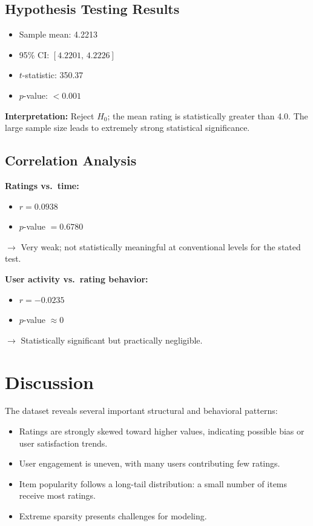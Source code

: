 \documentclass[conference]{IEEEtran}
\begin{document}
\subsection{Hypothesis Testing Results}

\begin{itemize}
    \item Sample mean: 4.2213
    \item 95\% CI: $[4.2201,\, 4.2226]$
    \item $t$-statistic: 350.37
    \item $p$-value: $< 0.001$
\end{itemize}

\textbf{Interpretation:} Reject $H_0$; the mean rating is statistically greater than 4.0. The large sample size leads to extremely strong statistical significance.

\subsection{Correlation Analysis}

\textbf{Ratings vs.\ time:}
\begin{itemize}
    \item $r = 0.0938$
    \item $p$-value $= 0.6780$
\end{itemize}
$\rightarrow$ Very weak; not statistically meaningful at conventional levels for the stated test.

\textbf{User activity vs.\ rating behavior:}
\begin{itemize}
    \item $r = -0.0235$
    \item $p$-value $\approx 0$
\end{itemize}
$\rightarrow$ Statistically significant but practically negligible.

\section{Discussion}

The dataset reveals several important structural and behavioral patterns:
\begin{itemize}
    \item Ratings are strongly skewed toward higher values, indicating possible bias or user satisfaction trends.
    \item User engagement is uneven, with many users contributing few ratings.
    \item Item popularity follows a long-tail distribution: a small number of items receive most ratings.
    \item Extreme sparsity presents challenges for modeling.
\end{itemize}
\end{document}

